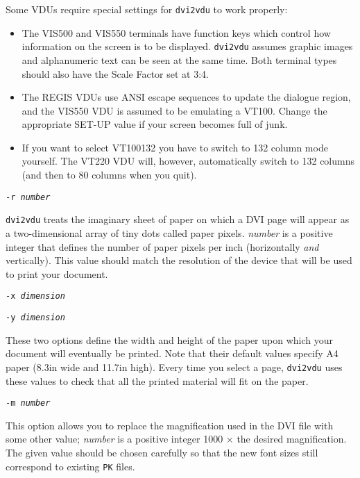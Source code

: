 \begin{list}
Some VDUs require special settings for {\tt dvi2vdu} to work properly:

\begin{itemize}

\item The VIS500 and VIS550 terminals have function keys which control how
information on the screen is to be displayed.  {\tt dvi2vdu}
assumes graphic images and alphanumeric text can be seen at the
same time.  
Both terminal types should also have the Scale Factor set at 3:4.

\item The REGIS VDUs use ANSI escape sequences to update the dialogue region,
and the VIS550 VDU is assumed to be emulating a VT100.
Change the appropriate SET-UP value if your screen becomes full of junk.

\item If you want to select VT100132 you have to switch to
132 column mode yourself.
The VT220 VDU will, however, automatically switch to 132 columns
(and then to 80 columns when you quit).
\end{itemize}


\item[\tt-r \em number]

{\tt dvi2vdu} treats the imaginary sheet of paper on which a DVI page will appear as
a two-dimensional array of tiny dots called paper pixels. {\em number} is a
positive integer that defines the number of paper pixels per inch (horizontally
{\em and} vertically).  This value should match the resolution of the device
that will be used to print your document.

\item[\tt -x \em dimension]
\item[\tt -y \em dimension]

These two options define the width and height of the paper upon which your
document will eventually be printed.
Note that their default values specify A4 paper
(8.3in wide and 11.7in high).
Every time you select a page, {\tt dvi2vdu} uses these values
to check that all the printed material will fit on the paper.


\item[\tt -m \em number]

This option allows you to replace the magnification used
in the DVI file with some other value;
{\em number} is a positive integer 1000 $\times$ the desired magnification.
The given value should be chosen carefully so that the new font sizes
still correspond to existing \verb+PK+ files.


\end{list}
